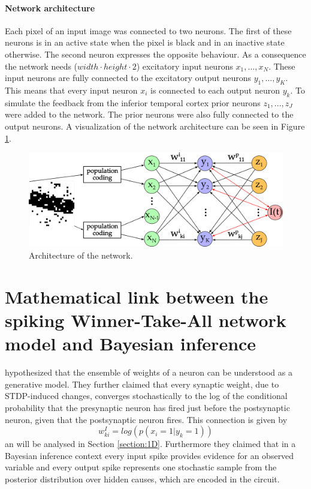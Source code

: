 \paragraph{Network architecture}
Each pixel of an input image was connected to two neurons. The first of these neurons is in an active state when the pixel is black and in an inactive state otherwise. The second neuron expresses the opposite behaviour. As a consequence the network needs ($width \cdot height \cdot 2$) excitatory input neurons $x_1,...,x_N$. These input neurons are fully connected to the excitatory output neurons $y_1,...,y_K$. This means that every input neuron $x_i$ is connected to each output neuron $y_k$. 
To simulate the feedback from the inferior temporal cortex prior neurons $z_1,...,z_J$ were added to the network. The prior neurons were also fully connected to the output neurons. A visualization of the network architecture can be seen in Figure \ref{fig:networkArchitecture}.

\begin{figure}
  \label{fig:networkArchitecture}
  \includegraphics[width=\linewidth]{figures/networkPlan.png}
  \caption{Architecture of the network.}
\end{figure}

\section{Mathematical link between the spiking Winner-Take-All network model and Bayesian inference}
\label{linkNetworkBayes}

\citet{nessler} hypothesized that the ensemble of weights of a neuron can be understood as a generative model. They further claimed that every synaptic weight, due to STDP-induced changes,  converges stochastically to the log of the conditional probability that the presynaptic neuron has fired just before the postsynaptic neuron, given that the postsynaptic neuron fires. This connection is given by
\begin{equation}
\label{eqn:weightProbLink}
 w^{I}_{ki} = log(p(x_i = 1 | y_k = 1))
\end{equation}
an will be analysed in Section \ref{section:1D}.
Furthermore they claimed that in a Bayesian inference context every input spike provides evidence for an observed variable and every output spike represents one stochastic sample from the posterior distribution over hidden causes, which are encoded in the circuit. 

